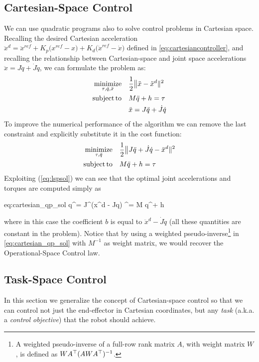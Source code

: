 \subsection{Cartesian-Space Control}
	We can use quadratic programs also to solve control problems in Cartesian space. 
	Recalling the desired Cartesian acceleration $\ddot x^d = \ddot x^{ref} + K_p\big(x^{ref}-x\big) + K_d\big(\dot x^{ref} - \dot x\big)$ defined in \eqref{eq:cartesiancontroller}, and recalling the relationship between Cartesian-space and joint space accelerations $\ddot{x} = J\ddot{q} + \dot{J} \dot{q}$, we can formulate the problem as:
	\begin{equation}
	\begin{aligned}
		\operatorname*{minimize}_{\tau, \ddot q, \ddot x} \quad & \frac12 \big\|\ddot x - \ddot x^d\|^2 \\
		\operatorname*{subject\,to} \quad & M\ddot q + h = \tau \\
		& \ddot x = J\ddot q + \dot J \dot q
	\end{aligned}
	\end{equation}
	To improve the numerical performance of the algorithm we can remove the last constraint and explicitly substitute it in the cost function:
	\begin{equation} \label{eq:qpcartesian}
		\begin{aligned}
			\operatorname*{minimize}_{\tau, \ddot q} \quad & \frac12 \big\| J\ddot q + \dot J\dot q - \ddot x^d\|^2 \\
			\operatorname*{subject\,to} \quad & M\ddot q + h = \tau
		\end{aligned}
	\end{equation}
	Exploiting (\ref{eq:lspsol}) we can see that the optimal joint accelerations and torques are computed simply as
	\begin{eqs}{eq:cartesian_qp_sol}
	\ddot q^\star = J^\dagger \big(\ddot x^d - \dot J\dot q\big) \qquad \tau^\star = M \ddot q^\star + h
	\end{eqs}
	where in this case the coefficient $b$ is equal to $\ddot x^d - \dot J \dot q$ (all these quantities are constant in the problem).
	Notice that by using a weighted pseudo-inverse\footnote{A weighted pseudo-inverse of a full-row rank matrix $A$, with weight matrix $W$, is defined as $W A^{\top} (A W A^{\top})^{-1}$.} in \eqref{eq:cartesian_qp_sol} with $M^{-1}$ as weight matrix, we would recover the Operational-Space Control law.
	
	
	
\subsection{Task-Space Control}
	In this section we generalize the concept of Cartesian-space control so that we can control not just the end-effector in Cartesian coordinates, but any \textit{task} (a.k.a. a \textit{control objective}) that the robot should achieve.
	
